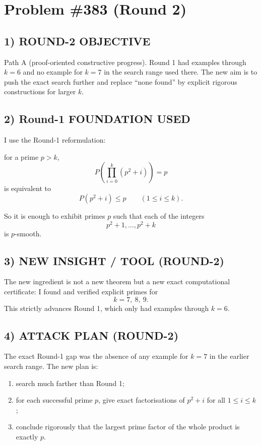 
\section{Problem \#383 (Round 2)}

\subsection*{1) ROUND-2 OBJECTIVE}

Path A (proof-oriented constructive progress). Round 1 had examples through $k=6$ and no example for $k=7$ in the search range used there. The new aim is to push the exact search further and replace ``none found'' by explicit rigorous constructions for larger $k$.

\subsection*{2) Round-1 FOUNDATION USED}

I use the Round-1 reformulation:

for a prime $p>k$,
\[
P\!\left(\prod_{i=0}^{k}(p^2+i)\right)=p
\]
is equivalent to
\[
P(p^2+i)\le p\qquad (1\le i\le k).
\]

So it is enough to exhibit primes $p$ such that each of the integers
\[
p^2+1,\dots,p^2+k
\]
is $p$-smooth.

\subsection*{3) NEW INSIGHT / TOOL (ROUND-2)}

The new ingredient is not a new theorem but a new exact computational certificate: I found and verified explicit primes for
\[
k=7,\ 8,\ 9.
\]
This strictly advances Round 1, which only had examples through $k=6$.

\subsection*{4) ATTACK PLAN (ROUND-2)}

The exact Round-1 gap was the absence of any example for $k=7$ in the earlier search range. The new plan is:

\begin{enumerate}
\item search much farther than Round 1;
\item for each successful prime $p$, give exact factorisations of $p^2+i$ for all $1\le i\le k$;
\item conclude rigorously that the largest prime factor of the whole product is exactly $p$.
\end{enumerate}

